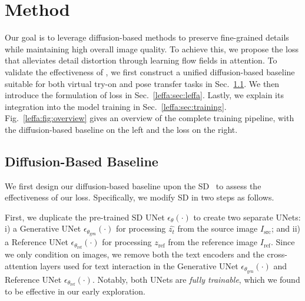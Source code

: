 \section{Method}
\label{leffa:sec:method}

Our goal is to leverage diffusion-based methods to preserve fine-grained details while maintaining high overall image quality.
To achieve this, we propose the \leffa{} loss that alleviates detail distortion through learning flow fields in attention.
To validate the effectiveness of \leffa{}, we first construct a unified diffusion-based baseline suitable for both virtual try-on and pose transfer tasks in Sec.~\ref{leffa:sec:baseline}.
We then introduce the formulation of \leffa{} loss in Sec.~\ref{leffa:sec:leffa}.
Lastly, we explain its integration into the model training in Sec.~\ref{leffa:sec:training}. Fig.~\ref{leffa:fig:overview} gives an overview of the complete training pipeline, with the diffusion-based baseline on the left and the \leffa{} loss on the right.

\subsection{Diffusion-Based Baseline}
\label{leffa:sec:baseline}

We first design our diffusion-based baseline upon the SD~\citep{rombach2022high, podell2023sdxl} to assess the effectiveness of our \leffa{} loss.
Specifically, we modify SD in two steps as follows.

First, we duplicate the pre-trained SD UNet $\epsilon_{\theta}(\cdot)$ to create two separate UNets: i) a Generative UNet $\epsilon_{\theta_{\text{gen}}}(\cdot)$ for processing $\hat{z_t}$ from the source image $I_\text{src}$; and ii) a Reference UNet $\epsilon_{\theta_{\text{ref}}}(\cdot)$ for processing $z_\text{ref}$ from the reference image $I_\text{ref}$.
Since we only condition on images, we remove both the text encoders and the cross-attention layers used for text interaction in the Generative UNet $\epsilon_{\theta_{\text{gen}}}(\cdot)$ and Reference UNet $\epsilon_{\theta_{\text{ref}}}(\cdot)$.
Notably, both UNets are \textit{fully trainable}, which we found to be effective in our early exploration.

